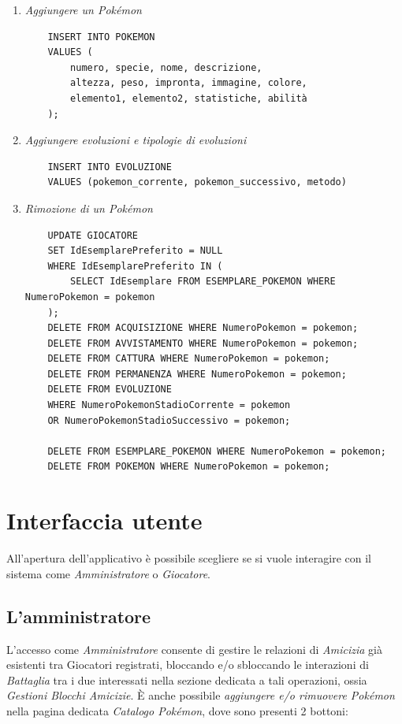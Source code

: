 \documentclass[a4paper,12pt]{report}
\begin{document}
\begin{enumerate}
	\item \textit{Aggiungere un Pokémon}
	\begin{verbatim}
	INSERT INTO POKEMON
	VALUES (
		numero, specie, nome, descrizione,
		altezza, peso, impronta, immagine, colore, 
		elemento1, elemento2, statistiche, abilità
	);
	\end{verbatim}
	
	\item \textit{Aggiungere evoluzioni e tipologie di evoluzioni}
	\begin{verbatim}
	INSERT INTO EVOLUZIONE
	VALUES (pokemon_corrente, pokemon_successivo, metodo)
	\end{verbatim}
	
	\item \textit{Rimozione di un Pokémon}
	\begin{verbatim}
	UPDATE GIOCATORE
	SET IdEsemplarePreferito = NULL
	WHERE IdEsemplarePreferito IN (
		SELECT IdEsemplare FROM ESEMPLARE_POKEMON WHERE NumeroPokemon = pokemon
	);
	DELETE FROM ACQUISIZIONE WHERE NumeroPokemon = pokemon;
	DELETE FROM AVVISTAMENTO WHERE NumeroPokemon = pokemon;
	DELETE FROM CATTURA WHERE NumeroPokemon = pokemon;
	DELETE FROM PERMANENZA WHERE NumeroPokemon = pokemon;
	DELETE FROM EVOLUZIONE
	WHERE NumeroPokemonStadioCorrente = pokemon
	OR NumeroPokemonStadioSuccessivo = pokemon;

	DELETE FROM ESEMPLARE_POKEMON WHERE NumeroPokemon = pokemon;
	DELETE FROM POKEMON WHERE NumeroPokemon = pokemon;
	\end{verbatim}
\end{enumerate}

\chapter{Interfaccia utente}

All'apertura dell'applicativo è possibile scegliere se si vuole interagire con il sistema come \textit{Amministratore} o \textit{Giocatore}.

\section{L'amministratore}

L'accesso come \textit{Amministratore} consente di gestire le relazioni di \textit{Amicizia} già esistenti tra Giocatori registrati, bloccando e/o sbloccando le interazioni di \textit{Battaglia} tra i due interessati nella sezione dedicata a tali operazioni, ossia \textit{Gestioni Blocchi Amicizie}.
È anche possibile \textit{aggiungere e/o rimuovere Pokémon} nella pagina dedicata \textit{Catalogo Pokémon}, dove sono presenti 2 bottoni: 
\end{document}
